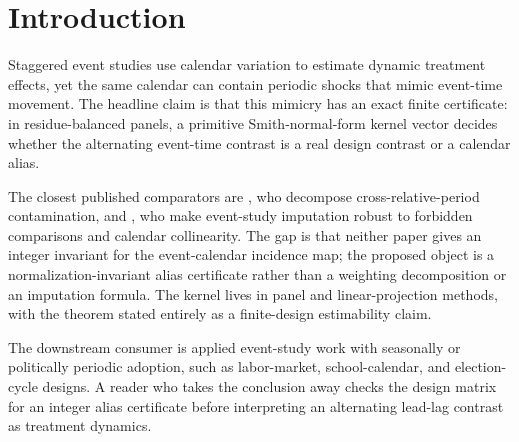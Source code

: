 \documentclass[11pt]{article}
\theoremstyle{definition}
\theoremstyle{plain}
\theoremstyle{remark}
\begin{document}
\section{Introduction}
Staggered event studies use calendar variation to estimate dynamic treatment effects, yet the same calendar can contain periodic shocks that mimic event-time movement. The headline claim is that this mimicry has an exact finite certificate: in residue-balanced panels, a primitive Smith-normal-form kernel vector decides whether the alternating event-time contrast is a real design contrast or a calendar alias.

The closest published comparators are \citet[Section 3]{SunAbraham2021EventStudies}, who decompose cross-relative-period contamination, and \citet[Sections 2--3]{BorusyakJaravelSpiess2024Revisiting}, who make event-study imputation robust to forbidden comparisons and calendar collinearity. The gap is that neither paper gives an integer invariant for the event-calendar incidence map; the proposed object is a normalization-invariant alias certificate rather than a weighting decomposition or an imputation formula. The kernel lives in panel and linear-projection methods, with the theorem stated entirely as a finite-design estimability claim.

The downstream consumer is applied event-study work with seasonally or politically periodic adoption, such as labor-market, school-calendar, and election-cycle designs. A reader who takes the conclusion away checks the design matrix for an integer alias certificate before interpreting an alternating lead-lag contrast as treatment dynamics.
\end{document}
